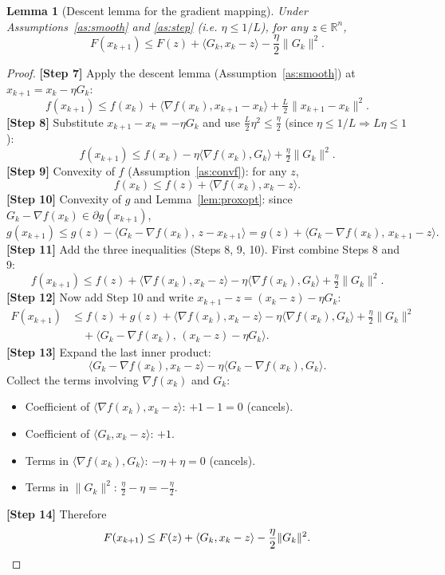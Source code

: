 \documentclass[11pt]{article}
\newtheorem{lemma}{Lemma}
\begin{document}
\begin{lemma}[Descent lemma for the gradient mapping]\label{lem:descent}
Under Assumptions~\ref{as:smooth} and \ref{as:step} (i.e. $\eta\le1/L$), for any $z\in\mathbb{R}^n$,
\[
F(x_{k+1}) \le F(z) + \langle G_k, x_k - z\rangle - \frac{\eta}{2}\|G_k\|^2.
\]
\end{lemma}
\begin{proof}
\textbf{[Step 7]} Apply the descent lemma (Assumption~\ref{as:smooth}) at $x_{k+1} = x_k - \eta G_k$:
\[
f(x_{k+1}) \le f(x_k) + \langle \nabla f(x_k), x_{k+1}-x_k\rangle + \tfrac{L}{2}\|x_{k+1}-x_k\|^2.
\]
\textbf{[Step 8]} Substitute $x_{k+1}-x_k = -\eta G_k$ and use $\tfrac{L}{2}\eta^2 \le \tfrac{\eta}{2}$ (since $\eta\le1/L \Rightarrow L\eta\le1$):
\[
f(x_{k+1}) \le f(x_k) - \eta\langle \nabla f(x_k), G_k\rangle + \tfrac{\eta}{2}\|G_k\|^2.
\]
\textbf{[Step 9]} Convexity of $f$ (Assumption~\ref{as:convf}): for any $z$,
\[
f(x_k) \le f(z) + \langle \nabla f(x_k), x_k - z\rangle.
\]
\textbf{[Step 10]} Convexity of $g$ and Lemma~\ref{lem:proxopt}: since $G_k-\nabla f(x_k)\in\partial g(x_{k+1})$,
\[
g(x_{k+1}) \le g(z) - \langle G_k - \nabla f(x_k),\, z - x_{k+1}\rangle
= g(z) + \langle G_k - \nabla f(x_k),\, x_{k+1} - z\rangle.
\]
\textbf{[Step 11]} Add the three inequalities (Steps 8, 9, 10). First combine Steps 8 and 9:
\[
f(x_{k+1}) \le f(z) + \langle \nabla f(x_k), x_k - z\rangle - \eta\langle\nabla f(x_k),G_k\rangle + \tfrac{\eta}{2}\|G_k\|^2.
\]
\textbf{[Step 12]} Now add Step 10 and write $x_{k+1} - z = (x_k - z) - \eta G_k$:
\begin{align*}
F(x_{k+1}) &\le f(z)+g(z) + \langle \nabla f(x_k), x_k - z\rangle - \eta\langle\nabla f(x_k),G_k\rangle + \tfrac{\eta}{2}\|G_k\|^2 \\
&\quad + \langle G_k - \nabla f(x_k),\, (x_k-z) - \eta G_k\rangle.
\end{align*}
\textbf{[Step 13]} Expand the last inner product:
\[
\langle G_k - \nabla f(x_k), x_k - z\rangle - \eta\langle G_k-\nabla f(x_k), G_k\rangle.
\]
Collect the terms involving $\nabla f(x_k)$ and $G_k$:
\begin{itemize}
\item Coefficient of $\langle \nabla f(x_k), x_k-z\rangle$: $+1 - 1 = 0$ (cancels).
\item Coefficient of $\langle G_k, x_k - z\rangle$: $+1$.
\item Terms in $\langle\nabla f(x_k),G_k\rangle$: $-\eta + \eta = 0$ (cancels).
\item Terms in $\|G_k\|^2$: $\tfrac{\eta}{2} - \eta = -\tfrac{\eta}{2}$.
\end{itemize}
\textbf{[Step 14]} Therefore
\[
F(x_{k+1}) \le F(z) + \langle G_k, x_k - z\rangle - \frac{\eta}{2}\|G_k\|^2. \qedhere
\]
\end{proof}
\end{document}
